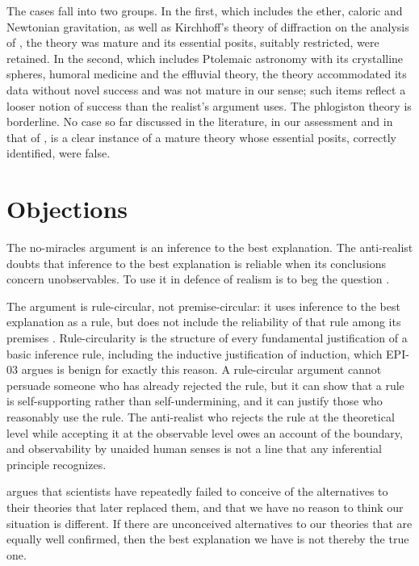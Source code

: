 \documentclass{situationist-preprint}
\begin{document}
The cases fall into two groups. In the first, which includes the ether, caloric and Newtonian gravitation, as well as Kirchhoff's theory of diffraction on the analysis of \citet{SaatsiVickers2011}, the theory was mature and its essential posits, suitably restricted, were retained. In the second, which includes Ptolemaic astronomy with its crystalline spheres, humoral medicine and the effluvial theory, the theory accommodated its data without novel success and was not mature in our sense; such items reflect a looser notion of success than the realist's argument uses. The phlogiston theory is borderline. No case so far discussed in the literature, in our assessment and in that of \citet{Vickers2013}, is a clear instance of a mature theory whose essential posits, correctly identified, were false.

\section{Objections}

\begin{objection}[Circularity]
The no-miracles argument is an inference to the best explanation. The anti-realist doubts that inference to the best explanation is reliable when its conclusions concern unobservables. To use it in defence of realism is to beg the question \citep{Laudan1981,Fine1984}.
\end{objection}

\begin{reply}
The argument is rule-circular, not premise-circular: it uses inference to the best explanation as a rule, but does not include the reliability of that rule among its premises \citep{Psillos1999}. Rule-circularity is the structure of every fundamental justification of a basic inference rule, including the inductive justification of induction, which EPI-03 argues is benign for exactly this reason. A rule-circular argument cannot persuade someone who has already rejected the rule, but it can show that a rule is self-supporting rather than self-undermining, and it can justify those who reasonably use the rule. The anti-realist who rejects the rule at the theoretical level while accepting it at the observable level owes an account of the boundary, and observability by unaided human senses is not a line that any inferential principle recognizes.
\end{reply}

\begin{objection}
\citet{Stanford2006} argues that scientists have repeatedly failed to conceive of the alternatives to their theories that later replaced them, and that we have no reason to think our situation is different. If there are unconceived alternatives to our theories that are equally well confirmed, then the best explanation we have is not thereby the true one.
\end{objection}
\end{document}
